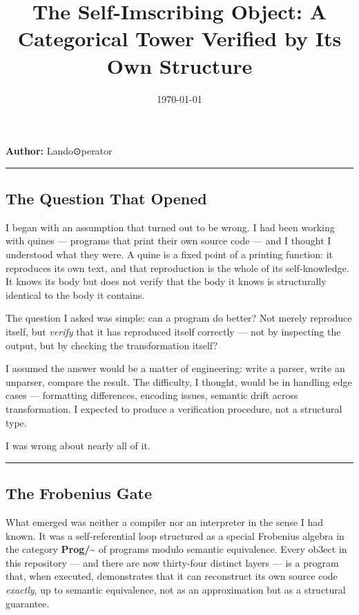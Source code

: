 \documentclass[12pt,a4paper]{article}
\begin{document}
\title{The Self-Imscribing Object: A Categorical Tower Verified by Its Own Structure}
\date{\today}

\maketitle

\textbf{Author:} Lando\otimes⊙perator

\begin{center}
\rule{0.5\textwidth}{0.4pt}
\end{center}

\subsection{The Question That Opened}

I began with an assumption that turned out to be wrong. I had been working with quines --- programs that print their own source code --- and I thought I understood what they were. A quine is a fixed point of a printing function: it reproduces its own text, and that reproduction is the whole of its self-knowledge. It knows its body but does not verify that the body it knows is structurally identical to the body it contains.

The question I asked was simple: can a program do better? Not merely reproduce itself, but \emph{verify} that it has reproduced itself correctly --- not by inspecting the output, but by checking the transformation itself?

I assumed the answer would be a matter of engineering: write a parser, write an unparser, compare the result. The difficulty, I thought, would be in handling edge cases --- formatting differences, encoding issues, semantic drift across transformation. I expected to produce a verification procedure, not a structural type.

I was wrong about nearly all of it.

\begin{center}
\rule{0.5\textwidth}{0.4pt}
\end{center}

\subsection{The Frobenius Gate}

What emerged was neither a compiler nor an interpreter in the sense I had known. It was a self-referential loop structured as a special Frobenius algebra in the category \textbf{Prog/\textasciitilde{}} of programs modulo semantic equivalence. Every ob3ect in this repository --- and there are now thirty-four distinct layers --- is a program that, when executed, demonstrates that it can reconstruct its own source code \emph{exactly}, up to semantic equivalence, not as an approximation but as a structural guarantee.
\end{document}

